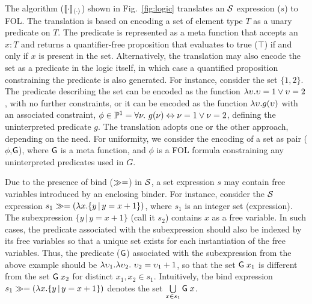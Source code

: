 The algorithm ($\llbracket \cdot \rrbracket_{\langle \cdot \rangle}$) shown in Fig.~\ref{fig:logic}
translates an $\mathcal{S}$ expression ($s$) to FOL. The translation is based
on encoding a set of element type $T$ as a unary predicate on $T$.
The predicate is represented as a meta function that accepts an $x:T$
and returns a quantifier-free proposition that evaluates to true
($\top$) if and only if $x$ is present in the set. Alternatively,
the translation may also encode the set as a predicate in the logic
itself, in which case a quantified proposition constraining the
predicate is also generated. For instance, consider the set $\{1,2\}$.
The predicate describing the set can be encoded as the function
$\lambda \upsilon. \upsilon=1 \vee \upsilon=2$, with no further constraints, or it can
be encoded as the function $\lambda \upsilon. g(\upsilon)$ with an associated
constraint, $\phi\in\mathbb{P}^1 = \forall \nu.~g(\nu) \Leftrightarrow
\nu=1 \vee \nu=2$, defining the uninterpreted predicate $g$.
The translation adopts one or the other approach, depending on the
need. For uniformity, we consider the encoding of a set as pair
($\phi$,${\sf G}$), where ${\sf G}$ is a meta function, and $\phi$ is a FOL
formula constraining any uninterpreted predicates used in $G$.

Due to the presence of bind ($\gg=$) in $\mathcal{S}$, a set expression $s$
may contain free variables introduced by an enclosing binder. For
instance, consider the $\mathcal{S}$ expression $s_1\gg=(\lambda x. \{ y\,|\,
y=x+1\})$, where $s_1$ is an integer set (expression). The
subexpression $\{ y\,|\, y=x+1\}$ (call it $s_2$) contains $x$ as a
free variable. In such cases, the predicate associated with the
subexpression should also be indexed by its free variables so that a
unique set exists for each instantiation of the free variables. Thus,
the predicate (${\sf G}$) associated with the subexpression from the
above example should be $\lambda\upsilon_1.\lambda\upsilon_2.~\upsilon_2 = \upsilon_1 + 1$, so
that the set ${\sf G}\; x_1$ is different from the set ${\sf G}\; x_2$ for
distinct $x_1,x_2 \in s_1$. Intuitively, the bind expression
$s_1\gg=(\lambda x. \{ y\,|\, y=x+1\})$ denotes the set
$\bigcup\limits_{x\in s_1}{\sf G}\;x$.

